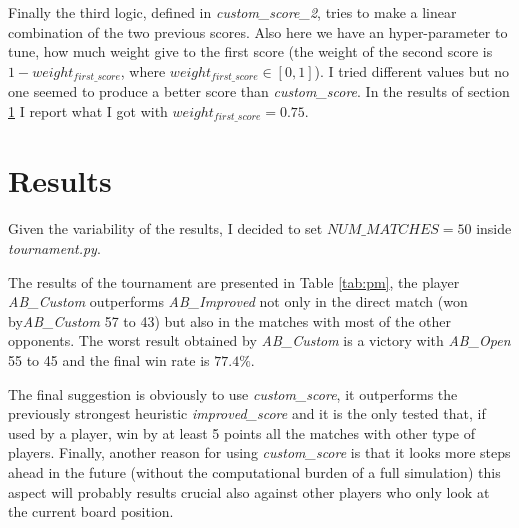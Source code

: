\documentclass[10pt,a4paper]{article}
\begin{document}
Finally the third logic, defined in \textit{custom\_score\_2}, tries to make a linear combination of the two previous scores. 
Also here we have an hyper-parameter to tune, how much weight give to the first score (the weight of the second score is $1-weight_{first\_score}$, where $weight_{first\_score}\in\left[ 0, 1\right]$). 
I tried different values but no one seemed to produce a better score than \textit{custom\_score}. 
In the results of section \ref{sec:results} I report what I got with  $weight_{first\_score}=0.75$.

\section{Results}\label{sec:results}

Given the variability of the results, I decided to set $NUM\_MATCHES=50$ inside  \textit{tournament.py}. 

The results of the tournament are presented in Table \ref{tab:pm}, the player \textit{AB\_Custom} outperforms \textit{AB\_Improved} not only in the direct match (won by\textit{AB\_Custom} 57  to 43) but also in the matches with most of the other opponents. 
The worst result obtained by \textit{AB\_Custom} is a victory with \textit{AB\_Open} 55 to 45 and the final win rate is $77.4\%$.

The final suggestion is obviously to use \textit{custom\_score}, it outperforms the previously strongest heuristic \textit{improved\_score} and it is the only tested that, if used by a player, win by at least 5 points all the matches with other type of players. 
Finally, another reason for using \textit{custom\_score} is that it looks more steps ahead in the future (without the computational burden of a full simulation) this aspect will probably results crucial also against other players who only look at the current board position.
\end{document}
